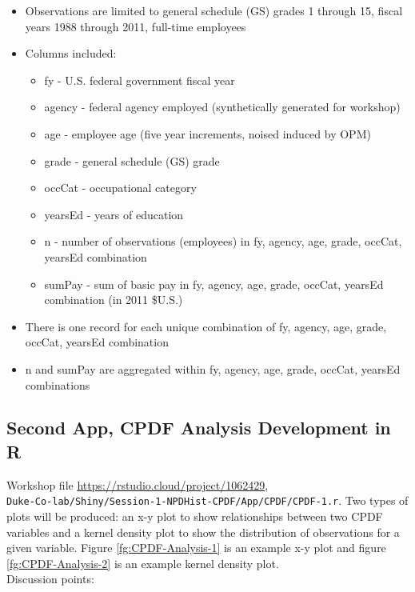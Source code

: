 \documentclass[10pt, letterpaper]{article}
\begin{document}
\begin{spacing}{1.0}
\begin{itemize}
    \item Observations are limited to general schedule (GS) grades 1 through 15, fiscal years 1988 through 2011, full-time employees
    \item Columns included:
    \begin{itemize}
        \item fy - U.S. federal government fiscal year
        \item agency - federal agency employed (synthetically generated for workshop)
        \item age - employee age (five year increments, noised induced by OPM)
        \item grade - general schedule (GS) grade
        \item occCat - occupational category 
        \item yearsEd - years of education
        \item n - number of observations (employees) in fy, agency, age, grade, occCat, yearsEd combination
        \item sumPay - sum of basic pay in fy, agency, age, grade, occCat, yearsEd combination (in 2011 \$U.S.)
    \end{itemize}
    \item There is one record for each unique combination of fy, agency, age, grade, occCat, yearsEd combination
    \item n and sumPay are aggregated within fy, agency, age, grade, occCat, yearsEd combinations
\end{itemize}


\subsection{Second App, CPDF Analysis Development in R}\label{sec:CPDF-R}

Workshop file \url{https://rstudio.cloud/project/1062429},\\ \texttt{Duke-Co-lab/Shiny/Session-1-NPDHist-CPDF/App/CPDF/CPDF-1.r}.  Two types of plots will be produced:  an x-y plot to show relationships between two CPDF variables and a kernel density plot to show the distribution of observations for a given variable.  Figure \ref{fg:CPDF-Analysis-1} is an example x-y plot and figure \ref{fg:CPDF-Analysis-2} is an example kernel density plot.\\

Discussion points:


\end{spacing}
\end{document}
